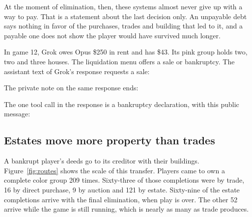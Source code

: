 At the moment of elimination, then, these systems almost never give up with a way to pay. That is a statement about the last decision only. An unpayable debt says nothing in favor of the purchases, trades and building that led to it, and a payable one does not show the player would have survived much longer.


In game 12, Grok owes Opus \$250 in rent and has \$43. Its pink group holds two, two and three houses. The liquidation menu offers a sale or bankruptcy. The assistant text of Grok's response requests a sale:


The private note on the same response ends:


The one tool call in the response is a bankruptcy declaration, with this public message:





\subsection{Estates move more property than trades}

A bankrupt player's deeds go to its creditor with their buildings. Figure~\ref{fig:routes} shows the scale of this transfer. Players came to own a complete color group 209 times. Sixty-three of those completions were by trade, 16 by direct purchase, 9 by auction and 121 by estate. Sixty-nine of the estate completions arrive with the final elimination, when play is over. The other 52 arrive while the game is still running, which is nearly as many as trade produces.

